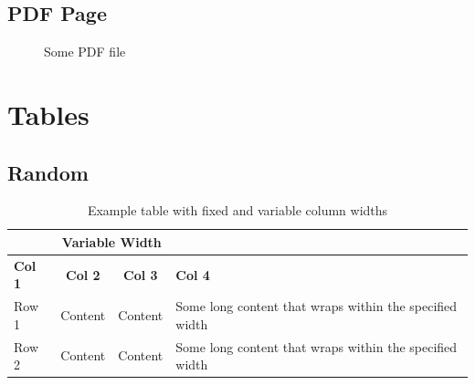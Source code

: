 \documentclass{scrartcl}
\begin{document}
\FloatBarrier
\noindent

\newpage
\subsection{PDF Page}
\begin{figure}[ht]
	
	\caption{Some PDF file}
	\label{fig:Tangrami}
\end{figure}
\FloatBarrier
\noindent
\newpage

\section{Tables}
\subsection{Random}
\noindent
\FloatBarrier
\begin{table}[htbp]
	\centering
	\caption{Example table with fixed and variable column widths}
	\begin{tabular}{|>{\centering\arraybackslash}p{2cm}|c|c|p{3cm}|}
		\hline
		\multicolumn{2}{|c|}{\textbf{Fixed Width}} & \multicolumn{2}{c|}{\textbf{Variable Width}}                                                                            \\
		\hline
		\textbf{Col 1}                             & \textbf{Col 2}                               & \textbf{Col 3} & \textbf{Col 4}                                          \\
		\hline
		Row 1                                      & Content                                      & Content        & Some long content that wraps within the specified width \\
		\hline
		Row 2                                      & Content                                      & Content        & Some long content that wraps within the specified width \\
		\hline
	\end{tabular}
	\label{tab:example}
\end{table}
\FloatBarrier
\end{document}
